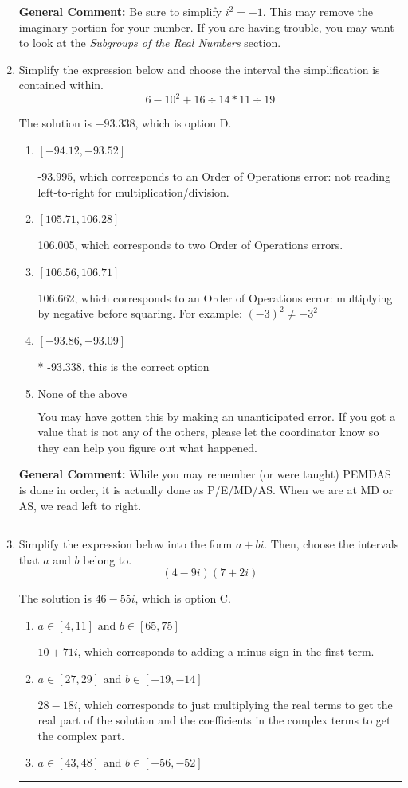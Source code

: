 \documentclass{extbook}[14pt]
\newcommand{\litem}[1]{\item #1

\rule{\textwidth}{0.4pt}}
\begin{document}
\begin{enumerate}
{\textbf{General Comment:} Be sure to simplify $i^2 = -1$. This may remove the imaginary portion for your number. If you are having trouble, you may want to look at the \textit{Subgroups of the Real Numbers} section.
}
\litem{
Simplify the expression below and choose the interval the simplification is contained within.
\[ 6 - 10^2 + 16 \div 14 * 11 \div 19 \]

The solution is \( -93.338 \), which is option D.\begin{enumerate}[label=\Alph*.]
\item \( [-94.12, -93.52] \)

 -93.995, which corresponds to an Order of Operations error: not reading left-to-right for multiplication/division.
\item \( [105.71, 106.28] \)

 106.005, which corresponds to two Order of Operations errors.
\item \( [106.56, 106.71] \)

 106.662, which corresponds to an Order of Operations error: multiplying by negative before squaring. For example: $(-3)^2 \neq -3^2$
\item \( [-93.86, -93.09] \)

* -93.338, this is the correct option
\item \( \text{None of the above} \)

 You may have gotten this by making an unanticipated error. If you got a value that is not any of the others, please let the coordinator know so they can help you figure out what happened.
\end{enumerate}

\textbf{General Comment:} While you may remember (or were taught) PEMDAS is done in order, it is actually done as P/E/MD/AS. When we are at MD or AS, we read left to right.
}
\litem{
Simplify the expression below into the form $a+bi$. Then, choose the intervals that $a$ and $b$ belong to.
\[ (4 - 9 i)(7 + 2 i) \]

The solution is \( 46 - 55 i \), which is option C.\begin{enumerate}[label=\Alph*.]
\item \( a \in [4, 11] \text{ and } b \in [65, 75] \)

 $10 + 71 i$, which corresponds to adding a minus sign in the first term.
\item \( a \in [27, 29] \text{ and } b \in [-19, -14] \)

 $28 - 18 i$, which corresponds to just multiplying the real terms to get the real part of the solution and the coefficients in the complex terms to get the complex part.
\item \( a \in [43, 48] \text{ and } b \in [-56, -52] \)


\end{enumerate}}
\end{enumerate}
\end{document}
